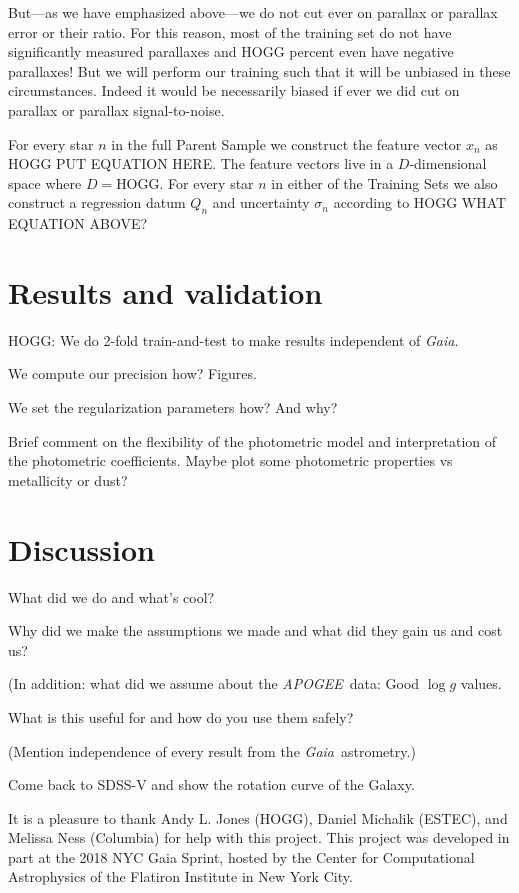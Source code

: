 \documentclass[modern]{aastex62}
\newcommand{\acronym}[1]{{\small{#1}}}
\newcommand{\project}[1]{\textsl{#1}}
\newcommand{\apogee}{\project{\acronym{APOGEE}}}
\newcommand{\gaia}{\project{Gaia}}
\newcommand{\logg}{\log g}
\begin{document}
But---as we have emphasized above---we do not cut ever on parallax or
parallax error or their ratio. For this reason, most of the training set
do not have significantly measured parallaxes and HOGG percent even have
negative parallaxes!
But we will perform our training such that it will be unbiased in these
circumstances.
Indeed it would be necessarily biased if ever we did cut on parallax or
parallax signal-to-noise.

For every star $n$ in the full Parent Sample we construct the feature
vector $x_n$ as HOGG PUT EQUATION HERE.
The feature vectors live in a $D$-dimensional space where $D=$HOGG.
For every star $n$ in either of the Training Sets we also construct a
regression datum $Q_n$ and uncertainty $\sigma_n$ according to HOGG WHAT EQUATION ABOVE?

\section{Results and validation}

HOGG: We do 2-fold train-and-test to make results independent of \gaia.

We compute our precision how? Figures.

We set the regularization parameters how? And why?

Brief comment on the flexibility of the photometric model and interpretation of the photometric coefficients. Maybe plot some photometric properties vs metallicity or dust?

\section{Discussion}

What did we do and what's cool?

Why did we make the assumptions we made and what did they gain us and cost us?

(In addition: what did we assume about the \apogee\ data: Good $\logg$ values.

What is this useful for and how do you use them safely?

(Mention independence of every result from the \gaia\ astrometry.)

Come back to SDSS-V and show the rotation curve of the Galaxy.

\acknowledgements
It is a pleasure to thank
  Andy L. Jones (HOGG),
  Daniel Michalik (\acronym{ESTEC}), and
  Melissa Ness (Columbia)
for help with this project.
This project was developed in part at the
2018 \acronym{NYC} Gaia Sprint, hosted by the Center for Computational Astrophysics of
the Flatiron Institute in New York City.
\end{document}
